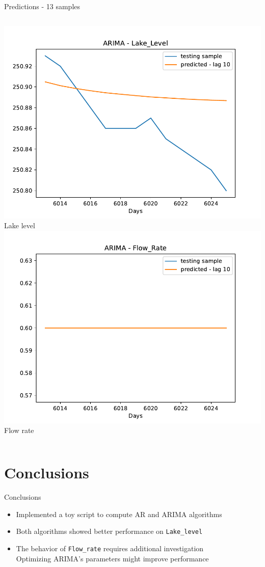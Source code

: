 \documentclass[aspectratio=169, glossy]{beamer}
\begin{document}
\begin{frame}{Predictions - 13 samples}
\begin{columns}
\begin{column}{0.5\columnwidth}
\begin{center}
        \vspace{0.5em}
        \includegraphics[width=0.5\columnwidth]{../plots/arima_lake_level_prediction.pdf}\\
        \tiny{Lake level}\\
        \vspace{0.5em}
        \includegraphics[width=0.5\columnwidth]{../plots/arima_flow_rate_prediction.pdf}\\
        \tiny{Flow rate}
      \end{center}
    \end{column}
  \end{columns}
\end{frame}
\section{Conclusions}

\begin{frame}{Conclusions}
  \begin{itemize}
    \item Implemented a toy script to compute AR and ARIMA algorithms
    \item Both algorithms showed better performance on \texttt{Lake\_level}
    \item The behavior of \texttt{Flow\_rate} requires additional investigation\\
          Optimizing ARIMA's parameters might improve performance
  \end{itemize}
\end{frame}
\end{document}
